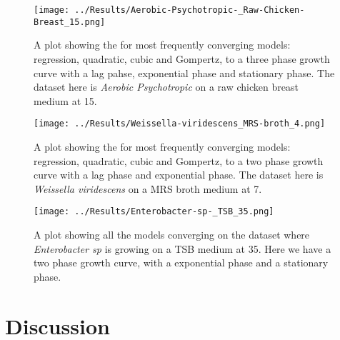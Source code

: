 \documentclass[11pt, a4paper]{article} %
\begin{document}
\begin{SCfigure}[][h]
\centering
\texttt{[image: ../Results/Aerobic-Psychotropic-\_Raw-Chicken-Breast\_15.png]} %
\caption{A plot showing the for most frequently converging models: regression, quadratic, cubic and Gompertz, to a three phase growth curve with a lag pahse, exponential phase and stationary phase. The dataset here is \textit{Aerobic Psychotropic} on a raw chicken breast medium at 15\textcelsius{}.}
\label{fig:3phase}
\end{SCfigure}

\begin{SCfigure}[][h]
\centering
\texttt{[image: ../Results/Weissella-viridescens\_MRS-broth\_4.png]} %
\caption{A plot showing the for most frequently converging models: regression, quadratic, cubic and Gompertz, to a two phase growth curve with a lag phase and exponential phase. The dataset here is \textit{Weissella viridescens} on a MRS broth medium at 7\textcelsius{}.}
\label{fig:common}
\end{SCfigure}

\begin{SCfigure}[][h]
\centering
\texttt{[image: ../Results/Enterobacter-sp-\_TSB\_35.png]}
\caption{A plot showing all the models converging on the dataset where \textit{Enterobacter sp} is growing on a TSB medium at 35\textcelsius{}. Here we have a two phase growth curve, with a exponential phase and a stationary phase.}
\label{fig:models}
\end{SCfigure}

\section{Discussion}
\end{document}
